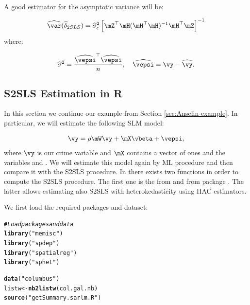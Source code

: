 \documentclass[english,12pt]{book}\usepackage[]{graphicx}\usepackage[]{xcolor}
\makeatletter
\newcommand{\hlstr}[1]{\textcolor[rgb]{0.192,0.494,0.8}{#1}}%
\newcommand{\hlcom}[1]{\textcolor[rgb]{0.678,0.584,0.686}{\textit{#1}}}%
\newcommand{\hlstd}[1]{\textcolor[rgb]{0.345,0.345,0.345}{#1}}%
\newcommand{\hlkwb}[1]{\textcolor[rgb]{0.69,0.353,0.396}{#1}}%
\newcommand{\hlkwd}[1]{\textcolor[rgb]{0.737,0.353,0.396}{\textbf{#1}}}%
\newenvironment{kframe}{%
 \def\at@end@of@kframe{}%
 \ifinner\ifhmode%
  \def\at@end@of@kframe{\end{minipage}}%
  \begin{minipage}{\columnwidth}%
 \fi\fi%
 \def\FrameCommand##1{\hskip\@totalleftmargin \hskip-\fboxsep
 \colorbox{shadecolor}{##1}\hskip-\fboxsep
     \hskip-\linewidth \hskip-\@totalleftmargin \hskip\columnwidth}%
 \MakeFramed {\advance\hsize-\width
   \@totalleftmargin\z@ \linewidth\hsize
   \@setminipage}}%
 {\par\unskip\endMakeFramed%
 \at@end@of@kframe}
\newenvironment{knitrout}{}{} %
\makeatother
\begin{document}
A good estimator for the asymptotic variance will be:

\begin{equation}
\widehat{\var}(\widehat{\delta}_{2SLS}) = \widehat{\sigma}^2_{\epsilon}\left[\mZ^\top \mH (\mH^\top\mH)^{-1}\mH^\top\mZ\right]^{-1}
\end{equation}
%
where:

\begin{equation}
  \widehat{\sigma}^2 = \frac{\widehat{\vepsi}^\top\widehat{\vepsi}}{n},\quad \widehat{\vepsi} = \vy - \widehat{\vy}.
\end{equation}

\subsection{S2SLS Estimation in R}

In this section we continue our example from Section \ref{sec:Anselin-example}. In particular, we will estimate the following SLM model:

\begin{equation*}
\vy = \rho\mW\vy + \mX\vbeta + \vepsi,
\end{equation*}
%
where $\vy$ is our crime variable and $\mX$ contains a vector of ones and the variables  and . We will estimate this model again by ML procedure and then compare it with the S2SLS procedure. In  there exists two functions in order to compute the  S2SLS procedure. The first one is the  from  and  from  package \citep{sphetp}. The latter allows estimating also S2SLS with heterokedasticity using HAC estimators. 

We first load the required packages and dataset:

\begin{knitrout}
\color{fgcolor}\begin{kframe}
\begin{alltt}
\hlcom{# Load packages and data}
\hlkwd{library}\hlstd{(}\hlstr{"memisc"}\hlstd{)}
\hlkwd{library}\hlstd{(}\hlstr{"spdep"}\hlstd{)}
\hlkwd{library}\hlstd{(}\hlstr{"spatialreg"}\hlstd{)}
\hlkwd{library}\hlstd{(}\hlstr{"sphet"}\hlstd{)}
\end{alltt}


{\ttfamily\noindent\itshape\color{messagecolor}{\#\# \\\#\# Attaching package: 'sphet'}}

{\ttfamily\noindent\itshape\color{messagecolor}{\#\# The following object is masked from 'package:spatialreg':\\\#\# \\\#\# \ \ \ \ impacts}}\begin{alltt}
\hlkwd{data}\hlstd{(}\hlstr{"columbus"}\hlstd{)}
\hlstd{listw} \hlkwb{<-} \hlkwd{nb2listw}\hlstd{(col.gal.nb)}
\hlkwd{source}\hlstd{(}\hlstr{"getSummary.sarlm.R"}\hlstd{)}
\end{alltt}
\end{kframe}
\end{knitrout}
\end{document}
